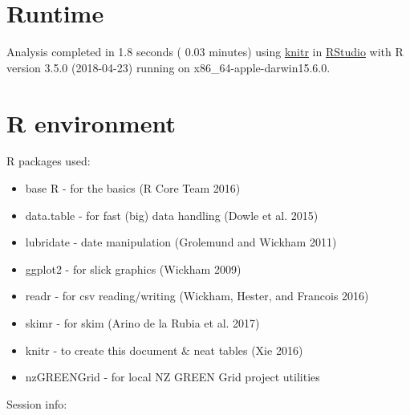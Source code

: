 \documentclass[]{article}
\providecommand{\tightlist}{%
  \setlength{\itemsep}{0pt}\setlength{\parskip}{0pt}}
\begin{document}
\section{Runtime}\label{runtime}

Analysis completed in 1.8 seconds ( 0.03 minutes) using
\href{https://cran.r-project.org/package=knitr}{knitr} in
\href{http://www.rstudio.com}{RStudio} with R version 3.5.0 (2018-04-23)
running on x86\_64-apple-darwin15.6.0.

\section{R environment}\label{r-environment}

R packages used:

\begin{itemize}
\tightlist
\item
  base R - for the basics (R Core Team 2016)
\item
  data.table - for fast (big) data handling (Dowle et al. 2015)
\item
  lubridate - date manipulation (Grolemund and Wickham 2011)
\item
  ggplot2 - for slick graphics (Wickham 2009)
\item
  readr - for csv reading/writing (Wickham, Hester, and Francois 2016)
\item
  skimr - for skim (Arino de la Rubia et al. 2017)
\item
  knitr - to create this document \& neat tables (Xie 2016)
\item
  nzGREENGrid - for local NZ GREEN Grid project utilities
\end{itemize}

Session info:
\end{document}
